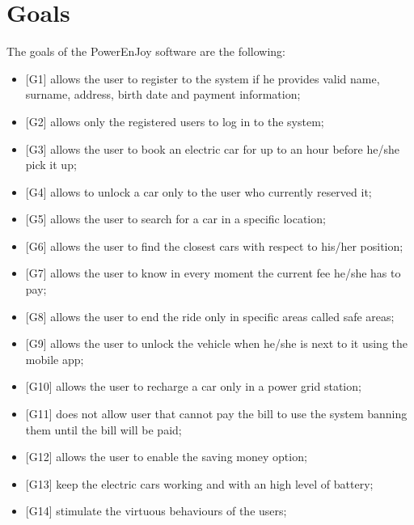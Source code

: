 \section{Goals}
The goals of the PowerEnJoy software are the following:
\begin{itemize}
    \item {[G1]} allows the user to register to the system if he provides valid name, surname, address, birth date and payment information;
    \item {[G2]} allows only the registered users to log in to the system;
	\item {[G3]} allows the user to book an electric car for up to an hour before he/she pick it up;
	\item {[G4]} allows to unlock a car only to the user who currently reserved it;
	\item {[G5]} allows the user to search for a car in a specific location; 
	\item {[G6]} allows the user to find the closest cars with respect to his/her position; 
	\item {[G7]} allows the user to know in every moment the current fee he/she has to pay;
	\item {[G8]} allows the user to end the ride only in specific areas called safe areas;
	\item {[G9]} allows the user to unlock the vehicle when he/she is next to it using the mobile app;
	\item {[G10]} allows the user to recharge a car only in a power grid station;
	\item {[G11]} does not allow user that cannot pay the bill to use the system banning them until the bill will be paid;
	\item {[G12]} allows the user to enable the saving money option;
	\item {[G13]} keep the electric cars working and with an high level of battery;
	\item {[G14]} stimulate  the virtuous behaviours of the users;
	
	
\end{itemize}

